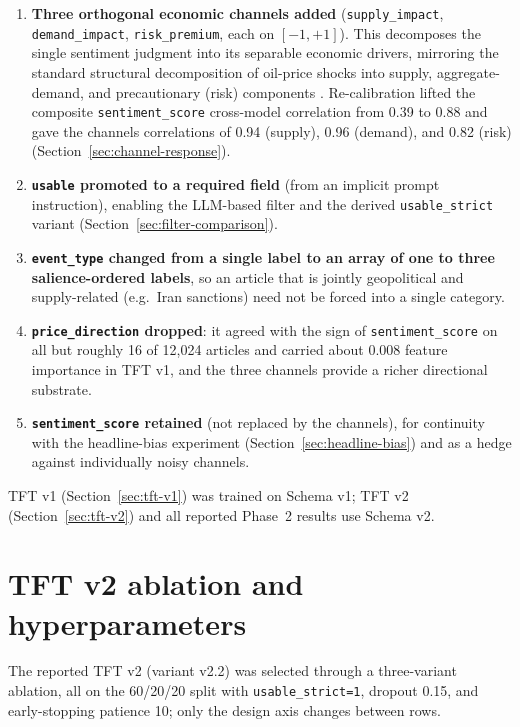 \begin{enumerate}
  \item \textbf{Three orthogonal economic channels added} (\texttt{supply\_impact}, \texttt{demand\_impact}, \texttt{risk\_premium}, each on $[-1, +1]$). This decomposes the single sentiment judgment into its separable economic drivers, mirroring the standard structural decomposition of oil-price shocks into supply, aggregate-demand, and precautionary (risk) components \citep{kilian2009}. Re-calibration lifted the composite \texttt{sentiment\_score} cross-model correlation from 0.39 to 0.88 and gave the channels correlations of 0.94 (supply), 0.96 (demand), and 0.82 (risk) (Section~\ref{sec:channel-response}).
  \item \textbf{\texttt{usable} promoted to a required field} (from an implicit prompt instruction), enabling the LLM-based filter and the derived \texttt{usable\_strict} variant (Section~\ref{sec:filter-comparison}).
  \item \textbf{\texttt{event\_type} changed from a single label to an array of one to three salience-ordered labels}, so an article that is jointly geopolitical and supply-related (e.g.\ Iran sanctions) need not be forced into a single category.
  \item \textbf{\texttt{price\_direction} dropped}: it agreed with the sign of \texttt{sentiment\_score} on all but roughly 16 of 12{,}024 articles and carried about 0.008 feature importance in TFT v1, and the three channels provide a richer directional substrate.
  \item \textbf{\texttt{sentiment\_score} retained} (not replaced by the channels), for continuity with the headline-bias experiment (Section~\ref{sec:headline-bias}) and as a hedge against individually noisy channels.
\end{enumerate}

TFT v1 (Section~\ref{sec:tft-v1}) was trained on Schema v1; TFT v2 (Section~\ref{sec:tft-v2}) and all reported Phase~2 results use Schema v2.

\chapter{TFT v2 ablation and hyperparameters}\label{app:ablation}

The reported TFT v2 (variant v2.2) was selected through a three-variant ablation, all on the 60/20/20 split with \texttt{usable\_strict=1}, dropout 0.15, and early-stopping patience 10; only the design axis changes between rows.

